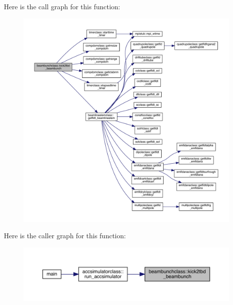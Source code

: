 Here is the call graph for this function\+:\nopagebreak
\begin{figure}[H]
\begin{center}
\leavevmode
\includegraphics[width=350pt]{namespacebeambunchclass_a513182caa95677071325abf64bba8279_cgraph}
\end{center}
\end{figure}
Here is the caller graph for this function\+:\nopagebreak
\begin{figure}[H]
\begin{center}
\leavevmode
\includegraphics[width=350pt]{namespacebeambunchclass_a513182caa95677071325abf64bba8279_icgraph}
\end{center}
\end{figure}
\mbox{\label{namespacebeambunchclass_a8a635f6138c645606329c5c4b81bdf51}} 
